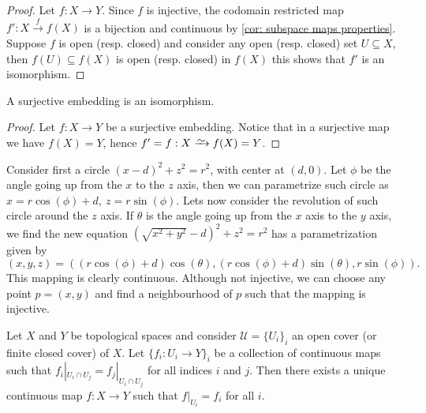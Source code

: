 \begin{proof}
Let \(f: X \to Y\). Since \(f\) is injective, the codomain restricted map
\(f': X \xrightarrow f f(X)\) is a bijection and continuous by \cref{cor:
subspace maps properties}. Suppose \(f\) is open (resp. closed) and consider
any open (resp. closed) set \(U \subseteq X\), then \(f(U) \subseteq f(X)\) is
open (resp. closed) in \(f(X)\) this shows that \(f'\) is an isomorphism.
\end{proof}

\begin{proposition}
A surjective embedding is an isomorphism.
\end{proposition}

\begin{proof}
Let \(f: X \to Y\) be a surjective embedding. Notice that in a surjective map
we have \(f(X) = Y\), hence \(f' = f : X \isoto f(X) = Y\).
\end{proof}

\begin{example}
Consider first a circle \((x - d)^2 + z^2 = r^2\), with center at \((d, 0)\).
Let \(\phi\) be the angle going up from the \(x\) to the \(z\) axis, then we
can parametrize such circle as \(x = r \cos(\phi) + d,\ z = r\sin(\phi)\).
Lets now consider the revolution of such circle around the \(z\) axis. If
\(\theta\) is the angle going up from the \(x\) axis to the \(y\) axis, we
find the new equation \((\sqrt{x^2 + y^2} - d)^2 + z^2 = r^2\) has a
parametrization given by
\[
  (x, y, z) = ((r \cos(\phi) + d)\cos(\theta), (r\cos(\phi) + d)\sin(\theta),
  r\sin(\phi)).
\]
This mapping is clearly continuous. Although not injective, we can choose any
point \(p = (x, y)\) and find a neighbourhood of \(p\) such that the mapping
is injective.
\end{example}

\begin{lemma}[Gluing]
Let \(X\) and \(Y\) be topological spaces and consider \(\mathcal U =
\{U_i\}_i\) an open cover (or finite closed cover) of \(X\). Let \(\{f_i: U_i
\to Y\}_i\) be a collection of continuous maps such that \(f_i|_{U_i \cap U_j}
= f_j|_{U_i \cap U_j}\) for all indices \(i\) and \(j\). Then there exists a
unique continuous map \(f: X \to Y\) such that \(f|_{U_i} = f_i\) for all \(i\).
\end{lemma}

